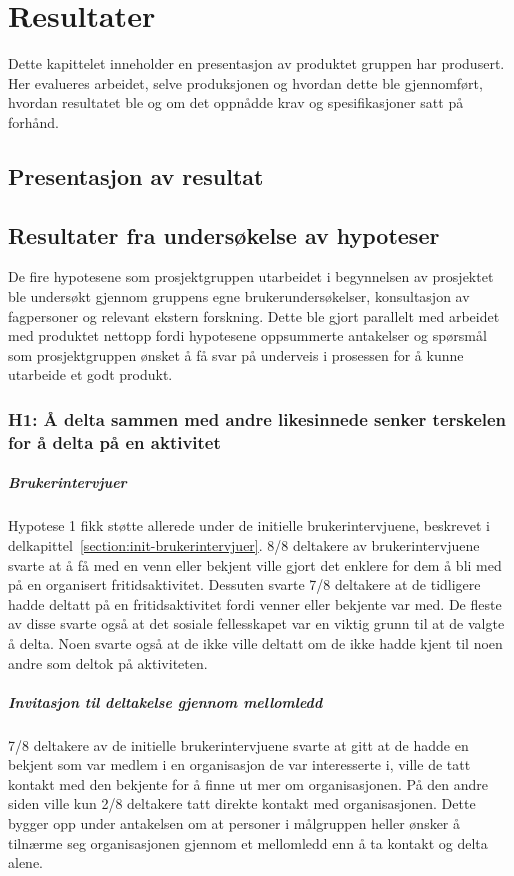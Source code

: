 \cleardoublepage
\chapter{Resultater}
\label{chap:results} 

Dette kapittelet inneholder en presentasjon av produktet gruppen har produsert. Her evalueres arbeidet, selve produksjonen og hvordan dette ble gjennomført, hvordan resultatet ble og om det oppnådde krav og spesifikasjoner satt på forhånd.

\section{Presentasjon av resultat}

\section{Resultater fra undersøkelse av hypoteser}

De fire hypotesene som prosjektgruppen utarbeidet i begynnelsen av prosjektet ble undersøkt gjennom gruppens egne brukerundersøkelser, konsultasjon av fagpersoner og relevant ekstern forskning. Dette ble gjort parallelt med arbeidet med produktet nettopp fordi hypotesene oppsummerte antakelser og spørsmål som prosjektgruppen ønsket å få svar på underveis i prosessen for å kunne utarbeide et godt produkt.

\subsection{H1: Å delta sammen med andre likesinnede senker terskelen for å delta på en aktivitet}
\paragraph{Brukerintervjuer}
Hypotese 1 fikk støtte allerede under de initielle brukerintervjuene, beskrevet i delkapittel~\ref{section:init-brukerintervjuer}. 8/8 deltakere av brukerintervjuene svarte at å få med en venn eller bekjent ville gjort det enklere for dem å bli med på en organisert fritidsaktivitet. Dessuten svarte 7/8 deltakere at de tidligere hadde deltatt på en fritidsaktivitet fordi venner eller bekjente var med. De fleste av disse svarte også at det sosiale fellesskapet var en viktig grunn til at de valgte å delta. Noen svarte også at de ikke ville deltatt om de ikke hadde kjent til noen andre som deltok på aktiviteten.

\paragraph{Invitasjon til deltakelse gjennom mellomledd}
7/8 deltakere av de initielle brukerintervjuene svarte at gitt at de hadde en bekjent som var medlem i en organisasjon de var interesserte i, ville de tatt kontakt med den bekjente for å finne ut mer om organisasjonen. På den andre siden ville kun 2/8 deltakere tatt direkte kontakt med organisasjonen. Dette bygger opp under antakelsen om at personer i målgruppen heller ønsker å tilnærme seg organisasjonen gjennom et mellomledd enn å ta kontakt og delta alene. 


